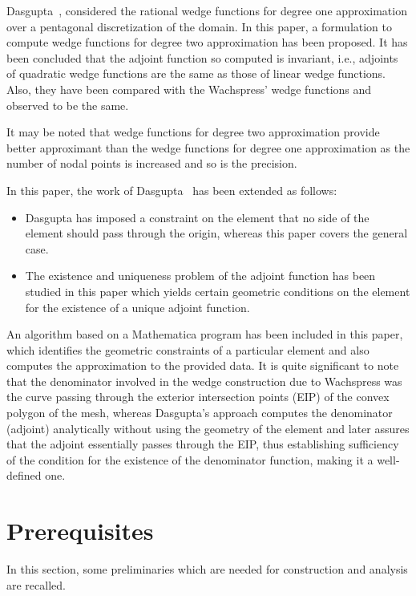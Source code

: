 \documentclass[automatic-bibliography]{univsciauth}
\begin{document}
Dasgupta~\cite{das}, considered the rational wedge functions for degree one
approximation over a pentagonal discretization of the domain. In this paper, a
formulation to compute wedge functions for degree two approximation has been
proposed. It has been concluded that the adjoint function so computed is
invariant, i.e., adjoints of quadratic wedge functions are the same as those of
linear wedge functions. Also, they have been compared with the Wachspress\rq{}
wedge functions and observed to be the same.

It may be noted that wedge functions for degree two approximation provide better
approximant than the wedge functions for degree one approximation as the number
of nodal points is increased and so is the precision.

In this paper, the work of Dasgupta~\cite{das} has been extended as follows:
\begin{itemize}
  \item Dasgupta has imposed a constraint on the element that no side of
        the element should pass through the origin, whereas this paper covers the
        general case.
  \item The existence and uniqueness problem of the adjoint function has
        been studied in this paper which yields certain geometric conditions on the
        element for the existence of a unique adjoint function.
\end{itemize}

An algorithm based on a Mathematica program has been included in this paper,
which identifies the geometric constraints of a particular element and also
computes the approximation to the provided data. It is quite significant to note
that the denominator involved in the wedge construction due to Wachspress was
the curve passing through the exterior intersection points (EIP) of the convex
polygon of the mesh, whereas Dasgupta's approach computes the denominator
(adjoint) analytically without using the geometry of the element and later
assures that the adjoint essentially passes through the EIP, thus establishing
sufficiency of the condition for the existence of the denominator function,
making it a well-defined one.

\section{Prerequisites}\label{sec2}
In this section, some preliminaries which are needed for construction and
analysis are recalled.
\end{document}
